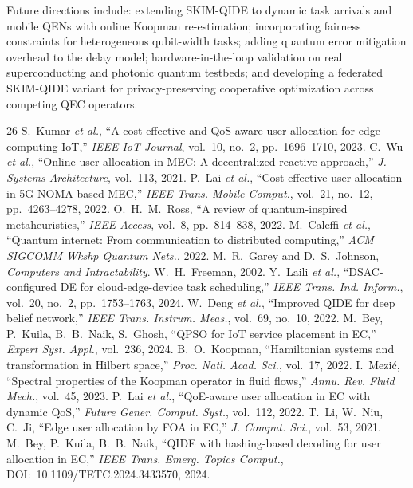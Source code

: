 \documentclass[10pt,twocolumn]{article}
\begin{document}
Future directions include: extending SKIM-QIDE to dynamic task arrivals and mobile QENs with online Koopman re-estimation; incorporating fairness constraints for heterogeneous qubit-width tasks; adding quantum error mitigation overhead to the delay model; hardware-in-the-loop validation on real superconducting and photonic quantum testbeds; and developing a federated SKIM-QIDE variant for privacy-preserving cooperative optimization across competing QEC operators.

\begin{thebibliography}{26}
 S.~Kumar \textit{et al.}, ``A cost-effective and QoS-aware user allocation for edge computing IoT,'' \textit{IEEE IoT Journal}, vol.~10, no.~2, pp.~1696--1710, 2023.
 C.~Wu \textit{et al.}, ``Online user allocation in MEC: A decentralized reactive approach,'' \textit{J. Systems Architecture}, vol.~113, 2021.
 P.~Lai \textit{et al.}, ``Cost-effective user allocation in 5G NOMA-based MEC,'' \textit{IEEE Trans. Mobile Comput.}, vol.~21, no.~12, pp.~4263--4278, 2022.
 O.~H.~M.~Ross, ``A review of quantum-inspired metaheuristics,'' \textit{IEEE Access}, vol.~8, pp.~814--838, 2022.
 M.~Caleffi \textit{et al.}, ``Quantum internet: From communication to distributed computing,'' \textit{ACM SIGCOMM Wkshp Quantum Nets.}, 2022.
 M.~R.~Garey and D.~S.~Johnson, \textit{Computers and Intractability}. W.~H.~Freeman, 2002.
 Y.~Laili \textit{et al.}, ``DSAC-configured DE for cloud-edge-device task scheduling,'' \textit{IEEE Trans. Ind. Inform.}, vol.~20, no.~2, pp.~1753--1763, 2024.
 W.~Deng \textit{et al.}, ``Improved QIDE for deep belief network,'' \textit{IEEE Trans. Instrum. Meas.}, vol.~69, no.~10, 2022.
 M.~Bey, P.~Kuila, B.~B.~Naik, S.~Ghosh, ``QPSO for IoT service placement in EC,'' \textit{Expert Syst. Appl.}, vol.~236, 2024.
 B.~O.~Koopman, ``Hamiltonian systems and transformation in Hilbert space,'' \textit{Proc. Natl. Acad. Sci.}, vol.~17, 2022.
 I.~Mezi\'{c}, ``Spectral properties of the Koopman operator in fluid flows,'' \textit{Annu. Rev. Fluid Mech.}, vol.~45, 2023.
 P.~Lai \textit{et al.}, ``QoE-aware user allocation in EC with dynamic QoS,'' \textit{Future Gener. Comput. Syst.}, vol.~112, 2022.
 T.~Li, W.~Niu, C.~Ji, ``Edge user allocation by FOA in EC,'' \textit{J. Comput. Sci.}, vol.~53, 2021.
 M.~Bey, P.~Kuila, B.~B.~Naik, ``QIDE with hashing-based decoding for user allocation in EC,'' \textit{IEEE Trans. Emerg. Topics Comput.}, DOI:~10.1109/TETC.2024.3433570, 2024.

\end{thebibliography}
\end{document}

